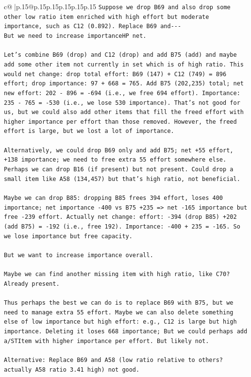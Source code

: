 \documentclass{article}
\begin{document}
{\begin{supertabular}{c@{$\;$}|p{.15\linewidth}@{}p{.15\linewidth}p{.15\linewidth}p{.15\linewidth}p{.15\linewidth}p{.15\linewidth}}
{{{\texttt{Suppose we drop B69 and also drop some other low ratio item enriched with high effort but moderate importance, such as C12 (0.892). Replace B69 and{-}{-}{-}} \\
\texttt{But we need to increase importanceHP net.} \\
\\ 
\texttt{Let's combine B69 (drop) and C12 (drop) and add B75 (add) and maybe add some other item not currently in set which is of high ratio. This would net change: drop total effort: B69 (147) + C12 (749) = 896 effort; drop importance: 97 + 668 = 765. Add B75 (202,235) total; net new effort: 202 {-} 896 = {-}694 (i.e., we free 694 effort). Importance: 235 {-} 765 = {-}530 (i.e., we lose 530 importance). That's not good for us, but we could also add other items that fill the freed effort with higher importance per effort than those removed. However, the freed effort is large, but we lost a lot of importance.} \\
\\ 
\texttt{Alternatively, we could drop B69 only and add B75; net +55 effort, +138 importance; we need to free extra 55 effort somewhere else. Perhaps we can drop B16 (if present) but not present. Could drop a small item like A58 (134,457) but that's high ratio, not beneficial.} \\
\\ 
\texttt{Maybe we can drop B85: dropping B85 frees 394 effort, loses 400 importance; net importance {-}400 vs B75 +235 => net {-}165 importance but free {-}239 effort. Actually net change: effort: {-}394 (drop B85) +202 (add B75) = {-}192 (i.e., free 192). Importance: {-}400 + 235 = {-}165. So we lose importance but free capacity.} \\
\\ 
\texttt{But we want to increase importance overall.} \\
\\ 
\texttt{Maybe we can find another missing item with high ratio, like C70? Already present.} \\
\\ 
\texttt{Thus perhaps the best we can do is to replace B69 with B75, but we need to manage extra 55 effort. Maybe we can also delete something else of low importance but high effort: e.g., C12 is large but high importance. Deleting it loses 668 importance; But we could perhaps add a/STItem with higher importance per effort. But likely not.} \\
\\ 
\texttt{Alternative: Replace B69 and A58 (low ratio relative to others? actually A58 ratio 3.41 high) not good.} \\
}}}
\end{supertabular}}
\end{document}
